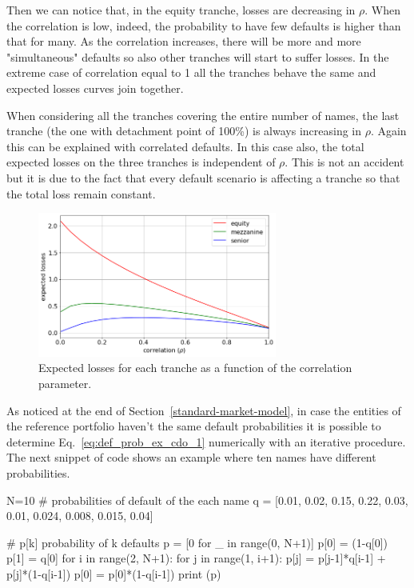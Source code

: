 Then we can notice that, in the equity tranche, losses are decreasing in $\rho$. When the correlation is low, indeed, the probability to have few defaults is higher than that for many. As the correlation increases, there will be more and more "simultaneous" defaults so also other tranches will start to suffer losses. In the extreme case of correlation equal to 1 all the tranches behave the same and expected losses curves join together. 

When considering all the tranches covering the entire number of names, the last tranche (the one with detachment point of 100\%) is always increasing in $\rho$. Again this can be explained with correlated defaults. In this case also, the total expected losses on the three tranches is independent of $\rho$. This is not an accident but it is due to the fact that every default scenario is affecting a tranche so that the total loss remain constant.

\begin{figure}[htb]
	\centering
	\includegraphics[width=0.7\textwidth]{figures/losses_vs_rho}
	\caption{Expected losses for each tranche as a function of the correlation parameter.}
	\label{fig:losses_rho}
\end{figure}

\begin{attention}
As noticed at the end of Section~\ref{standard-market-model}, in case the entities of the reference portfolio haven't the same default probabilities it is possible to determine Eq.~\ref{eq:def_prob_ex_cdo_1} numerically with an iterative procedure. The next snippet of code shows an example where ten names have different probabilities.

\begin{attpython}
N=10
# probabilities of default of the each name
q = [0.01, 0.02, 0.15, 0.22, 0.03, 0.01, 0.024, 0.008, 0.015, 0.04]

# p[k] probability of k defaults
p = [0 for _ in range(0, N+1)]
p[0] = (1-q[0])
p[1] = q[0]
for i in range(2, N+1):
    for j in range(1, i+1):
        p[j] = p[j-1]*q[i-1] + p[j]*(1-q[i-1])
    p[0] = p[0]*(1-q[i-1])
print (p)
\end{attpython}
\begin{ioutput}
[0.5655235318063276, 0.350403844356834, 0.11955743831716371,
 0.0330669128164737, 0.007898678014359, 0.00081191731818153,
 5.350491409986e-05, 2.81423807427e-06, 1.2554827537575e-07,
 5.216612301099e-09, 2.08664492043e-10]
\end{ioutput}
\end{attention}

